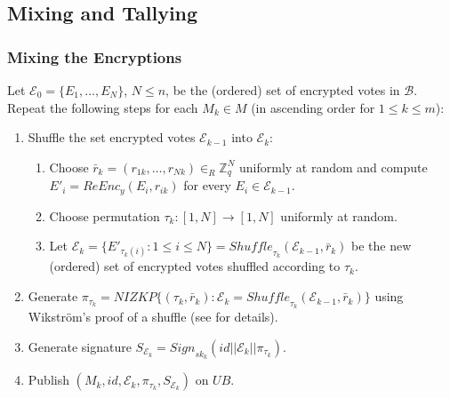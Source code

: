\documentclass[bibtotoc,halfparskip,oneside]{scrreprt}
\newcommand{\eid}{\mathit{id}\xspace}
\newcommand{\sk}[1]{\mathit{sk}_{#1}\xspace}
\newcommand{\UB}{\ensuremath{\mathit{UB}}\xspace}
\newcommand{\Mixer}[1]{\ensuremath{\mathit{M}_{#1}}\xspace}
\begin{document}
\subsection{Mixing and Tallying}

\subsubsection{Mixing the Encryptions}

Let $\mathcal{E}_0=\{E_1,\ldots,E_N\}$, $N\leq n$, be the (ordered) set of encrypted votes in $\mathcal{B}$. Repeat the following steps for each $\Mixer{k}\in M$ (in ascending order for $1\leq k\leq m$):
\begin{enumerate}
	\item Shuffle the set encrypted votes $\mathcal{E}_{k-1}$ into $\mathcal{E}_{k}$:
	\begin{enumerate}
		\item Choose $\bar{r}_{k}=(r_{1k},\ldots,r_{Nk})\in_R\mathbb{Z}_q^N$ uniformly at random and compute $E'_i=\mathit{ReEnc}_y(E_i,r_{ik})$ for every $E_i\in \mathcal{E}_{k-1}$.
		\item Choose permutation $\tau_k:[1,N]\rightarrow[1,N]$ uniformly at random.
		\item Let $\mathcal{E}_k=\{E'_{\tau_k(i)}: 1\leq i\leq N\}=\mathit{Shuffle}_{\tau_k}(\mathcal{E}_{k-1},\bar{r}_k)$ be the new (ordered) set of encrypted votes shuffled according to $\tau_k$.
	\end{enumerate}
	\item Generate $\pi_{\tau_k}=\mathit{NIZKP}\{(\tau_k,\bar{r}_k):\mathcal{E}_{k}=\mathit{Shuffle}_{\tau_k}(\mathcal{E}_{k-1},\bar{r}_k)\}$ using Wikström's proof of a shuffle (see  for details).
	\item Generate signature $S_{\mathcal{E}_k}=\mathit{Sign}_{\sk{k}}(\eid||\mathcal{E}_k||\pi_{\tau_k})$.
	\item Publish $(\Mixer{k},\eid,\mathcal{E}_k,\pi_{\tau_k},S_{\mathcal{E}_k})$ on \UB.
\end{enumerate}
\end{document}
